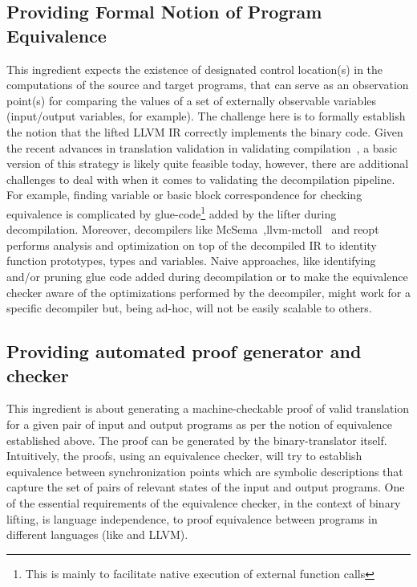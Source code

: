 \subsection{Providing Formal Notion of Program Equivalence} This ingredient
expects the existence of designated control location(s) in the computations of
the source and target programs, that can serve as an observation point(s) for
comparing the values of a set of externally observable variables (input/output
    variables, for example). The challenge here is to formally establish the
notion that the lifted LLVM IR  correctly implements the \ISA binary code.
Given the recent advances in translation validation in validating
compilation~\cite{VOC2002,TVOC:CAV2005,Necula:2000,Sewell:2013,Kundu:2009,Kedar:SAS2013,DDEC:OOPSLA:2013,Tate:2009,Tristan:2011},
  a basic version of this strategy is likely quite feasible today, however,
  there are additional challenges to deal with when it comes to validating the
  decompilation pipeline. For example, finding variable or  basic block
  correspondence for checking equivalence is complicated by
  glue-code\footnote{This is mainly to facilitate native execution of external
    function calls} added by the lifter during decompilation. Moreover,
    decompilers like
    McSema~\cite{McSema:Recon14},llvm-mctoll~\cite{llvm-mctoll} and
    reopt~\cite{reopt} performs analysis and optimization on top of the
    decompiled IR to identity function prototypes, types and variables.
    Naive approaches, like identifying and/or pruning glue code added during
    decompilation or to make the equivalence checker aware of the optimizations
    performed by the decompiler, might work for a specific decompiler but,
    being ad-hoc, will not be easily scalable to others. 
      

\subsection{Providing automated proof generator and checker} This ingredient is
about generating a machine-checkable proof  of valid translation for a given
pair of input and output programs as per the notion of equivalence established
above. The proof can be generated by  the binary-translator itself.
Intuitively, the proofs, using an equivalence checker,  will try to establish
equivalence between synchronization points which are symbolic descriptions that
capture the set of pairs of relevant states of the input and output programs.
One of the essential requirements of the equivalence checker,  in the context
of binary lifting, is language independence, to proof equivalence
between programs in different languages (like \ISA and LLVM). 


